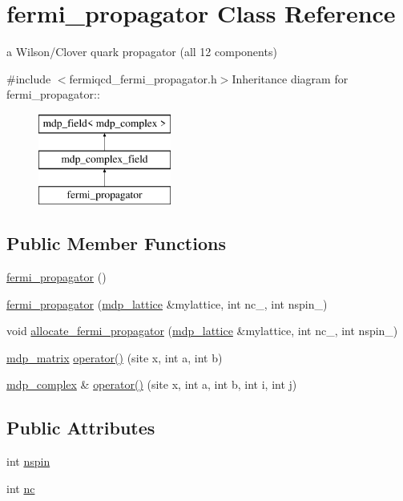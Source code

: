\hypertarget{classfermi__propagator}{
\section{fermi\_\-propagator Class Reference}
\label{classfermi__propagator}
}


a Wilson/Clover quark propagator (all 12 components)  


{\ttfamily \#include $<$fermiqcd\_\-fermi\_\-propagator.h$>$}Inheritance diagram for fermi\_\-propagator::\begin{figure}[H]
\begin{center}
\leavevmode
\includegraphics[height=3cm]{classfermi__propagator}
\end{center}
\end{figure}
\subsection*{Public Member Functions}
\begin{DoxyCompactItemize}
\item 
\hyperlink{classfermi__propagator_a55bbd357d5ffd3b57f835dab4a06d261}{fermi\_\-propagator} ()
\item 
\hyperlink{classfermi__propagator_a41b0242793ca3da9ec2e67cdc05a9149}{fermi\_\-propagator} (\hyperlink{classmdp__lattice}{mdp\_\-lattice} \&mylattice, int nc\_\-, int nspin\_)
\item 
void \hyperlink{classfermi__propagator_a8ee1c8631f83f4e4876eff6253c41954}{allocate\_\-fermi\_\-propagator} (\hyperlink{classmdp__lattice}{mdp\_\-lattice} \&mylattice, int nc\_\-, int nspin\_)
\item 
\hyperlink{classmdp__matrix}{mdp\_\-matrix} \hyperlink{classfermi__propagator_afb016830eaa4959a21901d5895adb4bc}{operator()} (site x, int a, int b)
\item 
\hyperlink{classmdp__complex}{mdp\_\-complex} \& \hyperlink{classfermi__propagator_a8552fbd45ff1fd6b450353713dc21bcd}{operator()} (site x, int a, int b, int i, int j)
\end{DoxyCompactItemize}
\subsection*{Public Attributes}
\begin{DoxyCompactItemize}
\item 
int \hyperlink{classfermi__propagator_a5eae6edf77379e878f84281aa9e32316}{nspin}
\item 
int \hyperlink{classfermi__propagator_a75d862433489db5a07b2ced97c21f9cc}{nc}
\end{DoxyCompactItemize}
